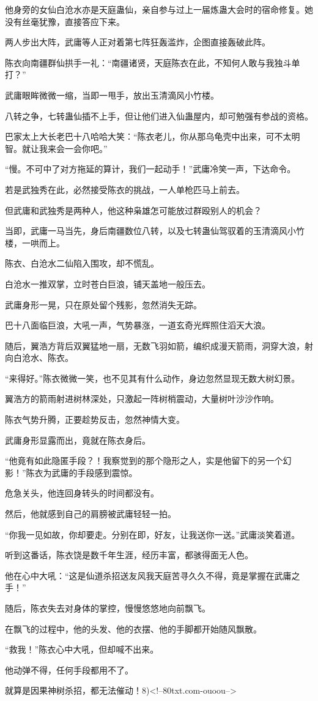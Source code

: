 \begin{this_body}
他身旁的女仙白沧水亦是天庭蛊仙，亲自参与过上一届炼蛊大会时的宿命修复。她没有丝毫犹豫，直接答应下来。

两人步出大阵，武庸等人正对着第七阵狂轰滥炸，企图直接轰破此阵。

陈衣向南疆群仙拱手一礼：“南疆诸贤，天庭陈衣在此，不知何人敢与我独斗单打？”

武庸眼眸微微一缩，当即一甩手，放出玉清滴风小竹楼。

八转之争，七转蛊仙插不上手，但让他们进入仙蛊屋内，却可勉强有参战的资格。

巴家太上大长老巴十八哈哈大笑：“陈衣老儿，你从那乌龟壳中出来，可不太明智。就让我来会一会你吧。”

“慢。不可中了对方拖延的算计，我们一起动手！”武庸冷笑一声，下达命令。

若是武独秀在此，必然接受陈衣的挑战，一人单枪匹马上前去。

但武庸和武独秀是两种人，他这种枭雄怎可能放过群殴别人的机会？

当即，武庸一马当先，身后南疆数位八转，以及七转蛊仙驾驭着的玉清滴风小竹楼，一哄而上。

陈衣、白沧水二仙陷入围攻，却不慌乱。

白沧水一推双掌，立时苍白巨浪，铺天盖地一般压去。

武庸身形一晃，只在原处留个残影，忽然消失无踪。

巴十八面临巨浪，大吼一声，气势暴涨，一道玄奇光辉照住滔天大浪。

随后，翼浩方背后双翼猛地一扇，无数飞羽如箭，编织成漫天箭雨，洞穿大浪，射向白沧水、陈衣。

“来得好。”陈衣微微一笑，也不见其有什么动作，身边忽然显现无数大树幻景。

翼浩方的箭雨射进树林深处，只激起一阵树梢震动，大量树叶沙沙作响。

陈衣气势升腾，正要趁势反击，忽然神情大变。

武庸身形显露而出，竟就在陈衣身后。

“他竟有如此隐匿手段？！我察觉到的那个隐形之人，实是他留下的另一个幻影！”陈衣为武庸的手段感到震惊。

危急关头，他连回身转头的时间都没有。

然后，他就感到自己的肩膀被武庸轻轻一拍。

“你我一见如故，你却要走。分别在即，好友，让我送你一送。”武庸淡笑着道。

听到这番话，陈衣饶是数千年生涯，经历丰富，都骇得面无人色。

他在心中大吼：“这是仙道杀招送友风我天庭苦寻久久不得，竟是掌握在武庸之手！”

随后，陈衣失去对身体的掌控，慢慢悠悠地向前飘飞。

在飘飞的过程中，他的头发、他的衣摆、他的手脚都开始随风飘散。

“救我！”陈衣心中大吼，但却喊不出来。

他动弹不得，任何手段都用不了。

就算是因果神树杀招，都无法催动！8)<!--80txt.com-ouoou-->

\end{this_body}

